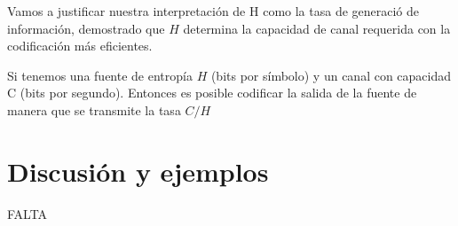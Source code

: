 Vamos a justificar nuestra interpretaci\'{o}n de H como la tasa de generaci\'{o} de informaci\'{o}n, demostrado que $H$ determina la capacidad de canal requerida con la codificaci\'{o}n m\'{a}s eficientes.

\begin{theorem}
\label{th:9}
Si tenemos una fuente de entrop\'{i}a $H$ (bits por s\'{i}mbolo) y un canal con capacidad C (bits por segundo). Entonces es posible codificar la salida de la fuente de manera que se transmite la tasa $C/H$
\end{theorem}

\clearpage

\chapter{Discusi\'{o}n y ejemplos}
\label{sec:19}

FALTA

